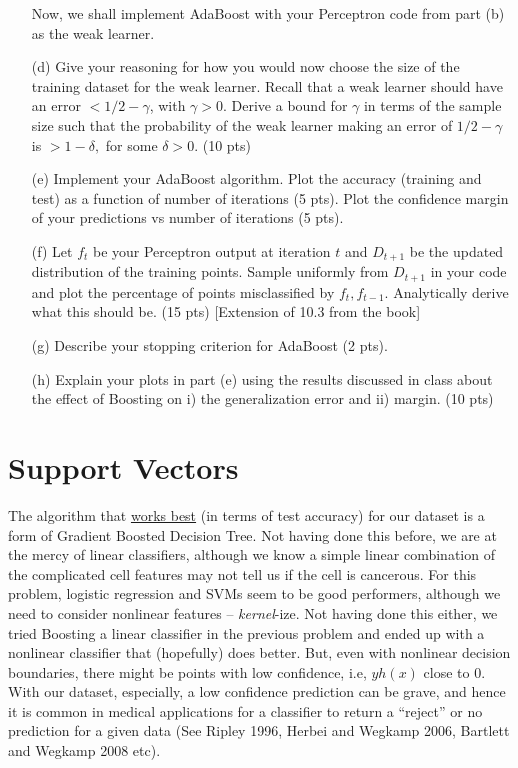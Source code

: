 \documentclass[12pt]{article}
\begin{document}
\begin{itemize}
		Now, we shall implement AdaBoost with your Perceptron code from part (b) as the weak learner. 
	\item[(d)] Give your reasoning for how you would now choose the size of the training dataset for the weak learner. Recall that a weak learner should have an error $< 1/2 - \gamma$, with $\gamma > 0$. Derive a bound for $\gamma$ in terms of the sample size such that the probability of the weak learner making an error of $1/2 - \gamma$ is $> 1- \delta,$ for some $\delta > 0.$ (10 pts)
	\item[(e)] Implement your AdaBoost algorithm. Plot the accuracy (training and test) as a function of number of iterations (5 pts). Plot the confidence margin of your predictions vs number of iterations (5 pts).
	\item[(f)] Let $f_t$ be your Perceptron output at iteration $t$ and $D_{t+1}$ be the updated distribution of the training points. Sample uniformly from $D_{t+1}$ in your code and plot the percentage of points misclassified by $f_t, f_{t-1}$. Analytically derive what this should be. (15 pts) [Extension of 10.3 from the book]
	\item[(g)] Describe your stopping criterion for AdaBoost (2 pts).
	\item[(h)] Explain your plots in part (e) using the results discussed in class about the effect of Boosting on i) the generalization error and ii) margin.  (10 pts)


\end{itemize}

\section{Support Vectors}

The algorithm that \href{https://archive.ics.uci.edu/dataset/17/breast+cancer+wisconsin+diagnostic}{works best} (in terms of test accuracy) for our dataset is a form of Gradient Boosted Decision Tree. Not having done this before, we are at the mercy of linear classifiers, although we know a simple linear combination of the complicated cell features may not tell us if the cell is cancerous. For this problem, logistic regression and SVMs seem to be good performers, although we need to consider nonlinear features -- \emph{kernel}-ize. Not having done this either, we tried Boosting a linear classifier in the previous problem and ended up with a nonlinear classifier that (hopefully) does better.
But, even with nonlinear decision boundaries, there might be points with low confidence, i.e, $y h(x)$ close to 0. With our dataset, especially, a low confidence prediction can be grave, and hence it is common in medical applications for a classifier to return a ``reject'' or no prediction for a given data (See Ripley 1996, Herbei and Wegkamp 2006, Bartlett and Wegkamp 2008 etc). 
\end{document}
